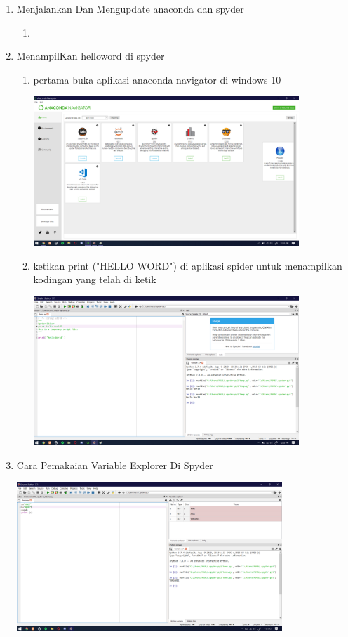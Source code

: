 \begin{enumerate}
\item Menjalankan Dan Mengupdate anaconda dan spyder
    \begin{enumerate}
        \item 
    \end{enumerate}
    
\item MenampilKan helloword di spyder
    \begin{enumerate}
        \item pertama buka aplikasi anaconda navigator di windows 10
         \begin{center}
            \includegraphics[width=10cm]{figures/Hw.PNG}
        \end{center}
        \item ketikan print ("HELLO WORD") di aplikasi spider untuk menampilkan kodingan yang telah di ketik
         \begin{center}
            \includegraphics[width=10cm]{figures/Hw1.png}
        \end{center}
    \end{enumerate}
\item Cara Pemakaian Variable Explorer Di Spyder

 \begin{center}
            \includegraphics[width=10cm]{figures/8.png}
        \end{center}

\end{enumerate}
 
